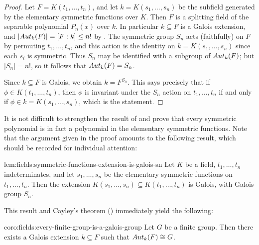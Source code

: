 \begin{proof}
  Let $F = K(t_1, \dots, t_n)$, and let $k = K(s_1, \dots, s_n)$ be
  the subfield generated by the elementary symmetric functions over
  $K$. Then $F$ is a splitting field of the separable polynomial
  $P_n(x)$ over $k$.  In particular $k \subseteq F$ is a Galois
  extension, and $|Aut_k(F)| = [F : k] \leq n!$ by
  . The symmetric group $S_n$ acts (faithfully)
  on $F$ by permuting $t_1, \dots, t_n$, and this action is the
  identity on $k = K(s_1, \dots, s_n)$ since each $s_i$ is
  symmetric. Thus $S_n$ may be identified with a subgroup of
  $Aut_k(F)$; but $|S_n| = n!$, so it follows that $Aut_k(F) = S_n$.

  Since $k \subseteq F$ is Galois, we obtain $k = F^{S_n}$. This says
  precisely that if $\phi \in K(t_1, \dots, t_n)$, then $\phi$ is
  invariant under the $S_n$ action on $t_1, \dots, t_n$ if and only if
  $\phi \in k = K(s_1, \dots, s_n)$, which is the statement.
\end{proof}
It is not difficult to strengthen the result of 
and prove that every symmetric polynomial is in fact a polynomial in
the elementary symmetric functions. Note that the argument given in
the proof amounts to the following result, which should be recorded
for individual attention:
\begin{lem}{}{lem:fields:symmetric-functions-extension-is-galois-sn}
  Let $K$ be a field, $t_1, \dots, t_n$ indeterminates, and let
  $s_1, \dots, s_n$ be the elementary symmetric functions on
  $t_1, \dots, t_n$. Then the extension
  $K(s_1, \dots, s_n) \subseteq K(t_1, \dots, t_n)$ is Galois, with
  Galois group $S_n$.
\end{lem}

This result and Cayley's theorem ()
immediately yield the following:

\begin{coro}{}{coro:fields:every-finite-group-is-a-galois-group}
  Let $G$ be a finite group. Then there exists a Galois extension
  $k \subseteq F$ such that $Aut_k(F) \cong G$.
\end{coro}

